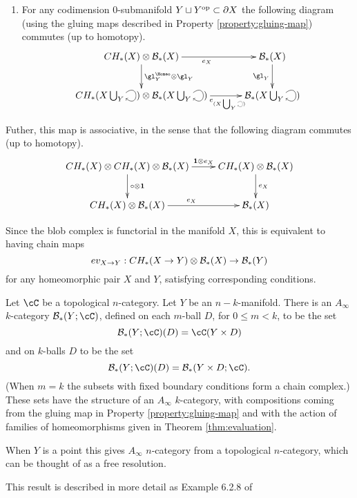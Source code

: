\documentclass{pnastwo}
\begin{document}
\begin{article}
\begin{thm}
\begin{enumerate}
\item For
any codimension $0$-submanifold $Y \sqcup Y^\text{op} \subset \partial X$ the following diagram
(using the gluing maps described in Property \ref{property:gluing-map}) commutes (up to homotopy).
\begin{equation*}
\xymatrix@C+0.3cm{
     \CH{X} \otimes \bc_*(X)
        \ar[r]_{e_{X}}  \ar[d]^{\gl^{\Homeo}_Y \otimes \gl_Y}  &
            \bc_*(X) \ar[d]_{\gl_Y} \\
     \CH{X \bigcup_Y \selfarrow} \otimes \bc_*(X \bigcup_Y \selfarrow) \ar[r]_<<<<<<<{e_{(X \bigcup_Y \scalebox{0.5}{\selfarrow})}}    & \bc_*(X \bigcup_Y \selfarrow)
}
\end{equation*}
\end{enumerate}

Futher, this map is associative, in the sense that the following diagram commutes (up to homotopy).
\begin{equation*}
\xymatrix{
\CH{X} \tensor \CH{X} \tensor \bc_*(X) \ar[r]^<<<<<{\id \tensor e_X} \ar[d]^{\compose \tensor \id} & \CH{X} \tensor \bc_*(X) \ar[d]^{e_X} \\
\CH{X} \tensor \bc_*(X) \ar[r]^{e_X} & \bc_*(X)
}
\end{equation*}
\end{thm}

Since the blob complex is functorial in the manifold $X$, this is equivalent to having chain maps
$$ev_{X \to Y} : CH_*(X \to Y) \otimes {\mathcal B}_*(X) \to {\mathcal B}_*(Y)$$
for any homeomorphic pair $X$ and $Y$, 
satisfying corresponding conditions.



\begin{thm}
\label{thm:blobs-ainfty}
Let $\cC$ be  a topological $n$-category.
Let $Y$ be an $n{-}k$-manifold. 
There is an $A_\infty$ $k$-category $\bc_*(Y;\cC)$, defined on each $m$-ball $D$, for $0 \leq m < k$, 
to be the set $$\bc_*(Y;\cC)(D) = \cC(Y \times D)$$ and on $k$-balls $D$ to be the set 
$$\bc_*(Y;\cC)(D) = \bc_*(Y \times D; \cC).$$ 
(When $m=k$ the subsets with fixed boundary conditions form a chain complex.) 
These sets have the structure of an $A_\infty$ $k$-category, with compositions coming from the gluing map in 
Property \ref{property:gluing-map} and with the action of families of homeomorphisms given in Theorem \ref{thm:evaluation}.
\end{thm}
\begin{rem}
When $Y$ is a point this gives $A_\infty$ $n$-category from a topological $n$-category, which can be thought of as a free resolution.
\end{rem}
This result is described in more detail as Example 6.2.8 of \cite{1009.5025}


\end{article}
\end{document}

